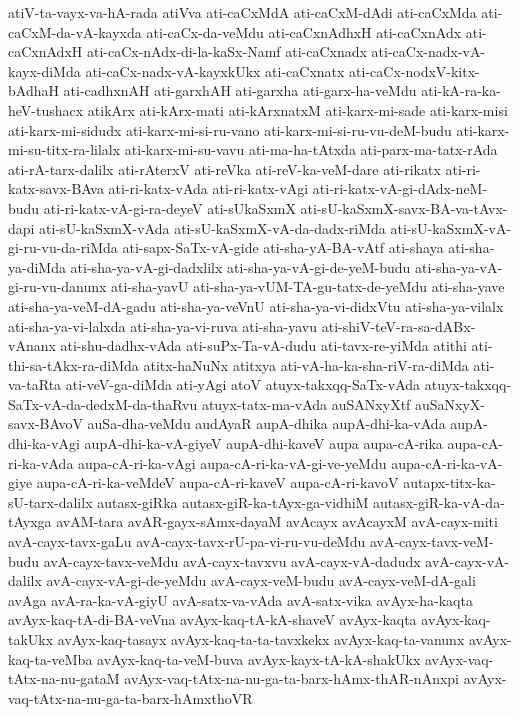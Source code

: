{atiV-ta-vayx-va-hA-rada
atiVva
ati-caCxMdA
ati-caCxM-dAdi
ati-caCxMda
ati-caCxM-da-vA-kayxda
ati-caCx-da-veMdu
ati-caCxnAdhxH
ati-caCxnAdx
ati-caCxnAdxH
ati-caCx-nAdx-di-la-kaSx-Namf
ati-caCxnadx
ati-caCx-nadx-vA-kayx-diMda
ati-caCx-nadx-vA-kayxkUkx
ati-caCxnatx
ati-caCx-nodxV-kitx-bAdhaH
ati-cadhxnAH
ati-garxhAH
ati-garxha
ati-garx-ha-veMdu
ati-kA-ra-ka-heV-tushacx
atikArx
ati-kArx-mati
ati-kArxnatxM
ati-karx-mi-sade
ati-karx-misi
ati-karx-mi-sidudx
ati-karx-mi-si-ru-vano
ati-karx-mi-si-ru-vu-deM-budu
ati-karx-mi-su-titx-ra-lilalx
ati-karx-mi-su-vavu
ati-ma-ha-tAtxda
ati-parx-ma-tatx-rAda
ati-rA-tarx-dalilx
ati-rAterxV
ati-reVka
ati-reV-ka-veM-dare
ati-rikatx
ati-ri-katx-savx-BAva
ati-ri-katx-vAda
ati-ri-katx-vAgi
ati-ri-katx-vA-gi-dAdx-neM-budu
ati-ri-katx-vA-gi-ra-deyeV
ati-sUkaSxmX
ati-sU-kaSxmX-savx-BA-va-tAvx-dapi
ati-sU-kaSxmX-vAda
ati-sU-kaSxmX-vA-da-dadx-riMda
ati-sU-kaSxmX-vA-gi-ru-vu-da-riMda
ati-sapx-SaTx-vA-gide
ati-sha-yA-BA-vAtf
ati-shaya
ati-sha-ya-diMda
ati-sha-ya-vA-gi-dadxlilx
ati-sha-ya-vA-gi-de-yeM-budu
ati-sha-ya-vA-gi-ru-vu-danunx
ati-sha-yavU
ati-sha-ya-vUM-TA-gu-tatx-de-yeMdu
ati-sha-yave
ati-sha-ya-veM-dA-gadu
ati-sha-ya-veVnU
ati-sha-ya-vi-didxVtu
ati-sha-ya-vilalx
ati-sha-ya-vi-lalxda
ati-sha-ya-vi-ruva
ati-sha-yavu
ati-shiV-teV-ra-sa-dABx-vAnanx
ati-shu-dadhx-vAda
ati-suPx-Ta-vA-dudu
ati-tavx-re-yiMda
atithi
ati-thi-sa-tAkx-ra-diMda
atitx-haNuNx
atitxya
ati-vA-ha-ka-sha-riV-ra-diMda
ati-va-taRta
ati-veV-ga-diMda
ati-yAgi
atoV
atuyx-takxqq-SaTx-vAda
atuyx-takxqq-SaTx-vA-da-dedxM-da-thaRvu
atuyx-tatx-ma-vAda
auSANxyXtf
auSaNxyX-savx-BAvoV
auSa-dha-veMdu
audAyaR
aupA-dhika
aupA-dhi-ka-vAda
aupA-dhi-ka-vAgi
aupA-dhi-ka-vA-giyeV
aupA-dhi-kaveV
aupa
aupa-cA-rika
aupa-cA-ri-ka-vAda
aupa-cA-ri-ka-vAgi
aupa-cA-ri-ka-vA-gi-ve-yeMdu
aupa-cA-ri-ka-vA-giye
aupa-cA-ri-ka-veMdeV
aupa-cA-ri-kaveV
aupa-cA-ri-kavoV
autapx-titx-ka-sU-tarx-dalilx
autasx-giRka
autasx-giR-ka-tAyx-ga-vidhiM
autasx-giR-ka-vA-da-tAyxga
avAM-tara
avAR-gayx-sAmx-dayaM
avAcayx
avAcayxM
avA-cayx-miti
avA-cayx-tavx-gaLu
avA-cayx-tavx-rU-pa-vi-ru-vu-deMdu
avA-cayx-tavx-veM-budu
avA-cayx-tavx-veMdu
avA-cayx-tavxvu
avA-cayx-vA-dadudx
avA-cayx-vA-dalilx
avA-cayx-vA-gi-de-yeMdu
avA-cayx-veM-budu
avA-cayx-veM-dA-gali
avAga
avA-ra-ka-vA-giyU
avA-satx-va-vAda
avA-satx-vika
avAyx-ha-kaqta
avAyx-kaq-tA-di-BA-veVna
avAyx-kaq-tA-kA-shaveV
avAyx-kaqta
avAyx-kaq-takUkx
avAyx-kaq-tasayx
avAyx-kaq-ta-ta-tavxkekx
avAyx-kaq-ta-vanunx
avAyx-kaq-ta-veMba
avAyx-kaq-ta-veM-buva
avAyx-kayx-tA-kA-shakUkx
avAyx-vaq-tAtx-na-nu-gataM
avAyx-vaq-tAtx-na-nu-ga-ta-barx-hAmx-thAR-nAnxpi
avAyx-vaq-tAtx-na-nu-ga-ta-barx-hAmxthoVR
}
